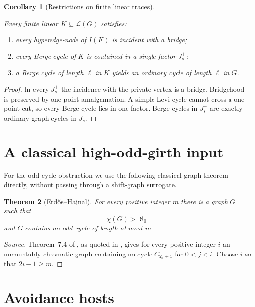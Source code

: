 \documentclass[a4paper,11pt,reqno]{amsart}
\providecommand{\tightlist}{\setlength{\itemsep}{0pt}\setlength{\parskip}{0pt}}
\theoremstyle{plain}
\newtheorem{theorem}{Theorem}[section]
\newtheorem{corollary}[theorem]{Corollary}
\theoremstyle{definition}
\theoremstyle{remark}
\begin{document}
\begin{corollary}[Restrictions on finite linear traces]\label{corollary-6.4-restrictions-on-finite-linear-traces}

Every finite linear \(K\subseteq\mathcal L(G)\) satisfies:

\begin{enumerate}
\def\labelenumi{\arabic{enumi}.}
\tightlist
\item
  every hyperedge-node of \(I(K)\) is incident with a bridge;
\item
  every Berge cycle of \(K\) is contained in a single factor \(J_s^+\);
\item
  a Berge cycle of length \(\ell\) in \(K\) yields an ordinary cycle of length \(\ell\) in \(G\).
\end{enumerate}

\end{corollary}
\begin{proof}
In every \(J_s^+\) the incidence with the private vertex is a bridge. Bridgehood is preserved by one-point amalgamation. A simple Levi cycle cannot cross a one-point cut, so every Berge cycle lies in one factor. Berge cycles in \(J_s^+\) are exactly ordinary graph cycles in \(J_s\).
\end{proof}

\section{A classical high-odd-girth input}\label{uncountably-chromatic-graphs-of-large-odd-girth}

For the odd-cycle obstruction we use the following classical graph theorem
directly, without passing through a shift-graph surrogate.

\begin{theorem}[Erdős--Hajnal]\label{theorem-7.1-high-odd-girth}
For every positive integer $m$ there is a graph $G$ such that
\[
\chi(G)>\aleph_0
\]
and $G$ contains no odd cycle of length at most $m$.
\end{theorem}

\begin{proof}[Source]
Theorem~7.4 of \citet[p.~76]{erdoshajnal1966}, as quoted in
\citet[Theorem~C, p.~428]{egh1975}, gives for every positive integer $i$ an
uncountably chromatic graph containing no cycle $C_{2j+1}$ for $0<j<i$.
Choose $i$ so that $2i-1\ge m$.
\end{proof}

\section{Avoidance hosts}\label{the-avoidance-hosts}
\end{document}
